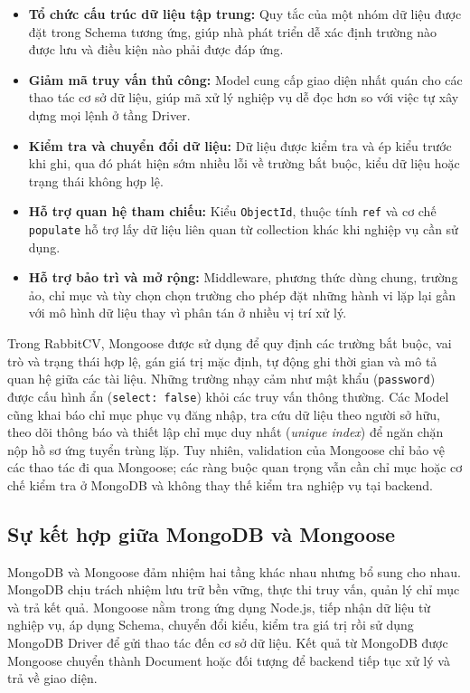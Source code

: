 \begin{itemize}
    \item \textbf{Tổ chức cấu trúc dữ liệu tập trung:} Quy tắc của một nhóm dữ liệu được đặt trong Schema tương ứng, giúp nhà phát triển dễ xác định trường nào được lưu và điều kiện nào phải được đáp ứng.

    \item \textbf{Giảm mã truy vấn thủ công:} Model cung cấp giao diện nhất quán cho các thao tác cơ sở dữ liệu, giúp mã xử lý nghiệp vụ dễ đọc hơn so với việc tự xây dựng mọi lệnh ở tầng Driver.

    \item \textbf{Kiểm tra và chuyển đổi dữ liệu:} Dữ liệu được kiểm tra và ép kiểu trước khi ghi, qua đó phát hiện sớm nhiều lỗi về trường bắt buộc, kiểu dữ liệu hoặc trạng thái không hợp lệ.

    \item \textbf{Hỗ trợ quan hệ tham chiếu:} Kiểu \texttt{ObjectId}, thuộc tính \texttt{ref} và cơ chế \texttt{populate} hỗ trợ lấy dữ liệu liên quan từ collection khác khi nghiệp vụ cần sử dụng.

    \item \textbf{Hỗ trợ bảo trì và mở rộng:} Middleware, phương thức dùng chung, trường ảo, chỉ mục và tùy chọn chọn trường cho phép đặt những hành vi lặp lại gần với mô hình dữ liệu thay vì phân tán ở nhiều vị trí xử lý.
\end{itemize}

Trong RabbitCV, Mongoose được sử dụng để quy định các trường bắt buộc, vai trò và trạng thái hợp lệ, gán giá trị mặc định, tự động ghi thời gian và mô tả quan hệ giữa các tài liệu. Những trường nhạy cảm như mật khẩu (\texttt{password}) được cấu hình ẩn (\texttt{select: false}) khỏi các truy vấn thông thường. Các Model cũng khai báo chỉ mục phục vụ đăng nhập, tra cứu dữ liệu theo người sở hữu, theo dõi thông báo và thiết lập chỉ mục duy nhất (\textit{unique index}) để ngăn chặn nộp hồ sơ ứng tuyển trùng lặp. Tuy nhiên, validation của Mongoose chỉ bảo vệ các thao tác đi qua Mongoose; các ràng buộc quan trọng vẫn cần chỉ mục hoặc cơ chế kiểm tra ở MongoDB và không thay thế kiểm tra nghiệp vụ tại backend.

\subsection{Sự kết hợp giữa MongoDB và Mongoose}

MongoDB và Mongoose đảm nhiệm hai tầng khác nhau nhưng bổ sung cho nhau. MongoDB chịu trách nhiệm lưu trữ bền vững, thực thi truy vấn, quản lý chỉ mục và trả kết quả. Mongoose nằm trong ứng dụng Node.js, tiếp nhận dữ liệu từ nghiệp vụ, áp dụng Schema, chuyển đổi kiểu, kiểm tra giá trị rồi sử dụng MongoDB Driver để gửi thao tác đến cơ sở dữ liệu. Kết quả từ MongoDB được Mongoose chuyển thành Document hoặc đối tượng để backend tiếp tục xử lý và trả về giao diện.

